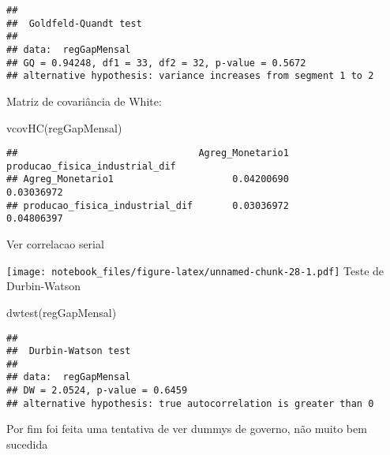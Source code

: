 \documentclass[
]{article}
\newenvironment{Shaded}{\begin{snugshade}}{\end{snugshade}}
\newcommand{\AttributeTok}[1]{\textcolor[rgb]{0.77,0.63,0.00}{#1}}
\newcommand{\FunctionTok}[1]{\textcolor[rgb]{0.00,0.00,0.00}{#1}}
\newcommand{\NormalTok}[1]{#1}
\newcommand{\SpecialCharTok}[1]{\textcolor[rgb]{0.00,0.00,0.00}{#1}}
\begin{document}
\begin{verbatim}
## 
##  Goldfeld-Quandt test
## 
## data:  regGapMensal
## GQ = 0.94248, df1 = 33, df2 = 32, p-value = 0.5672
## alternative hypothesis: variance increases from segment 1 to 2
\end{verbatim}

Matriz de covariância de White:

\begin{Shaded}
\begin{Highlighting}[]
\FunctionTok{vcovHC}\NormalTok{(regGapMensal)}
\end{Highlighting}
\end{Shaded}

\begin{verbatim}
##                                Agreg_Monetario1 producao_fisica_industrial_dif
## Agreg_Monetario1                     0.04200690                     0.03036972
## producao_fisica_industrial_dif       0.03036972                     0.04806397
\end{verbatim}

Ver correlacao serial

\begin{Shaded}
\end{Shaded}

\texttt{[image: notebook\_files/figure-latex/unnamed-chunk-28-1.pdf]}
Teste de Durbin-Watson

\begin{Shaded}
\begin{Highlighting}[]
\FunctionTok{dwtest}\NormalTok{(regGapMensal)}
\end{Highlighting}
\end{Shaded}

\begin{verbatim}
## 
##  Durbin-Watson test
## 
## data:  regGapMensal
## DW = 2.0524, p-value = 0.6459
## alternative hypothesis: true autocorrelation is greater than 0
\end{verbatim}

Por fim foi feita uma tentativa de ver dummys de governo, não muito bem
sucedida
\end{document}

